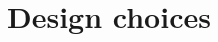 \documentclass[11pt]{report}
\begin{document}
\section{Design choices}
\begin{comment}

The paragraphs below, elaborates on the following design choices:
null-is-false
javascript-like scope

\begin{itemize}
\item LightScript should be based on EcmaScript, and run within EcmaScript interpreters.
\item 
\end{itemize}

LightScript should be based on EcmaScript, such that LightScript scripts runs without modification within an EcmaScript interpreter. 
This will make it possible to use LightScript to write applications that both run on low end mobile devices and also in web browsers, binding those two platforms together.
It also makes it easier for EcmaScript/JavaScript programmers to learn LightScript.
It is not possible to make LightScript EcmaScript compliant, as EcmaScript has requirements that are not possible to fullfill on low end mobile devices.

\subsection{*Design choices from the platform}

As CLDC/1.0 is target, there are no support for floating point numbers in the vm,
and thus all numbers in LightScript will be integers, which opposite to EcmaScript
where the numbers are floating point.
For addition, subtraction, multiplication, and remainder of division, the results are equivalent of floats and integers, if we start out with integers and do not have overflows. The division operator has the issue that it yields different results on integers and floats, so the \verb|/| operator is not implemented. Instead it is possible to make an integer division function \verb|div(a, b)|, both on top EcmaScript and as a Java function exported to LightScript.
Casting to integers in the EcmaScript can be done like:
\verb~function div(a, b) { return (a/b)|0; }~
The limits of the low end mobile devices also encourages choosing the simple and fast solutions.


\end{comment}
\end{document}
